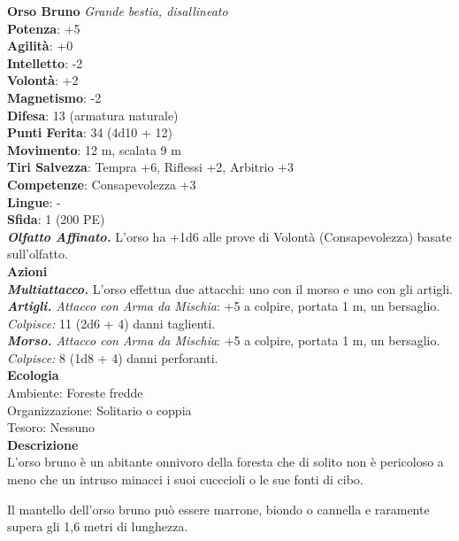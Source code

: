 \begin{multicols}{2}
\medskip\textbf{Orso Bruno}
\emph{Grande bestia, disallineato}\\
\textbf{Potenza}: +5\\
\textbf{Agilità}: +0\\
\textbf{Intelletto}: -2\\
\textbf{Volontà}: +2\\
\textbf{Magnetismo}: -2\\
\textbf{Difesa}: 13 (armatura naturale)\\
\textbf{Punti Ferita}: 34 (4d10 + 12)\\
\textbf{Movimento}: 12 m, scalata 9 m\\
\textbf{Tiri Salvezza}: Tempra +6, Riflessi +2, Arbitrio +3 \\
\textbf{Competenze}: Consapevolezza +3\\
\textbf{Lingue}: -\\
\textbf{Sfida}: 1 (200 PE)\smallskip\\
\emph{\textbf{Olfatto Affinato.}} L'orso ha +1d6 alle prove di Volontà (Consapevolezza) basate sull'olfatto.\\
\smallskip\textbf{Azioni}\\
\emph{\textbf{Multiattacco.}} L'orso effettua due attacchi: uno con il morso e uno con gli artigli.\\
\emph{\textbf{Artigli.} Attacco con Arma da Mischia}: +5 a colpire, portata 1 m, un bersaglio.\\
\emph{Colpisce:} 11 (2d6 + 4) danni taglienti.\\
\emph{\textbf{Morso.} Attacco con Arma da Mischia}: +5 a colpire, portata 1 m, un bersaglio.\\
\emph{Colpisce:} 8 (1d8 + 4) danni perforanti.\\
\textbf{Ecologia}\\
Ambiente: Foreste fredde\\
Organizzazione: Solitario o coppia\\
Tesoro: Nessuno\\
\textbf{Descrizione}\\

L'orso bruno è un abitante onnivoro della foresta che di solito non è pericoloso a meno che un intruso minacci i suoi cucccioli o le sue fonti di cibo.

Il mantello dell'orso bruno può essere marrone, biondo o cannella e raramente supera gli 1,6 metri di lunghezza. 


\end{multicols}
